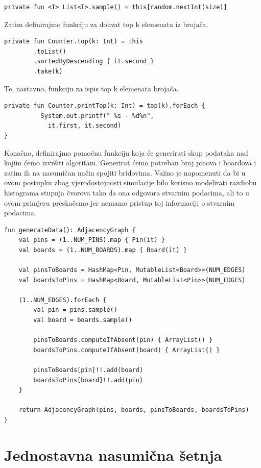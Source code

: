 \documentclass[times, utf8, seminar]{fer}
\begin{document}
\begin{lstlisting}
private fun <T> List<T>.sample() = this[random.nextInt(size)]
\end{lstlisting}

Zatim definirajmo funkciju za dohvat top k elemenata iz brojača.

\begin{lstlisting}
private fun Counter.top(k: Int) = this
        .toList()
        .sortedByDescending { it.second }
        .take(k)
\end{lstlisting}

Te, nastavno, funkciju za ispis top k elemenata brojača.

\begin{lstlisting}
private fun Counter.printTop(k: Int) = top(k).forEach {
		  System.out.printf(" %s - %d%n",
		  	it.first, it.second)
}
\end{lstlisting}

Konačno, definirajmo pomoćnu funkciju koja će generirati skup podataka nad kojim ćemo izvršiti algoritam. Generirat ćemo potreban broj pinova i boardova i zatim ih na nasumičan način spojiti bridovima. Važno je napomenuti da bi u ovom postupku zbog vjerodostojnosti simulacije bilo korisno modelirati razdiobu histograma stupnja čvorova tako da ona odgovara stvarnim podacima, ali to u ovom primjeru preskačemo jer nemamo pristup toj informaciji o stvarnim podacima.

\begin{lstlisting}
fun generateData(): AdjacencyGraph {
    val pins = (1..NUM_PINS).map { Pin(it) }
    val boards = (1..NUM_BOARDS).map { Board(it) }

    val pinsToBoards = HashMap<Pin, MutableList<Board>>(NUM_EDGES)
    val boardsToPins = HashMap<Board, MutableList<Pin>>(NUM_EDGES)

    (1..NUM_EDGES).forEach {
        val pin = pins.sample()
        val board = boards.sample()

        pinsToBoards.computeIfAbsent(pin) { ArrayList() }
        boardsToPins.computeIfAbsent(board) { ArrayList() }

        pinsToBoards[pin]!!.add(board)
        boardsToPins[board]!!.add(pin)
    }

    return AdjacencyGraph(pins, boards, pinsToBoards, boardsToPins)
}
\end{lstlisting}

\section{Jednostavna nasumična šetnja}
\end{document}
